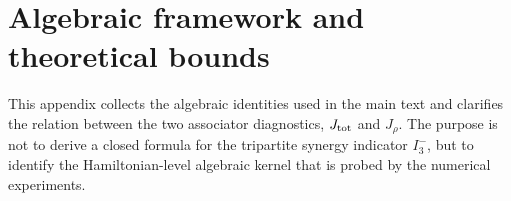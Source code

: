 \documentclass[aps,physrev,preprint,groupedaddress]{revtex4-2}
\begin{document}
%


\appendix
\section{Algebraic framework and theoretical bounds}\label{sm:algebra}
This appendix collects the algebraic identities used in the main text and clarifies the relation between the two associator diagnostics, $J_{\rm tot}$ and $J_{\rho}$. The purpose is not to derive a closed formula for the tripartite synergy indicator $I_3^{-}$, but to identify
the Hamiltonian-level algebraic kernel that is probed by the numerical experiments.
\end{document}
